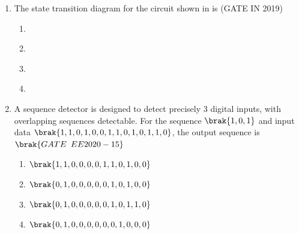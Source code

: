 \begin{enumerate}[label=\arabic*.,ref=\theenumi]
\begin{figure}[H]
\caption{}
\label{fig:3bitcounter.jpg}
\end{figure}
%
\item The state transition diagram for the circuit shown in 
	is
                         \hfill(GATE IN 2019)
\begin{figure}[H]
\centering
    \resizebox{0.5\columnwidth}{!}{%

	}
    \caption{}
	\label{fig:GATE IN2019,39}
\end{figure}
%
\begin{enumerate}
\item 
\begin{figure}[H]
\centering
    \resizebox{0.5\columnwidth}{!}{%

	}
    \caption{}
	\label{fig:GATE IN2019,39-1}
\end{figure}
\item 
\begin{figure}[H]
\centering
    \resizebox{0.5\columnwidth}{!}{%

	}
    \caption{}
	\label{fig:GATE IN2019,39-2}
\end{figure}
\item 
\begin{figure}[H]
\centering
    \resizebox{0.5\columnwidth}{!}{%

	}
    \caption{}
	\label{fig:GATE IN2019,39-3}
\end{figure}
\item 
\begin{figure}[H]
\centering
    \resizebox{0.5\columnwidth}{!}{%

	}
    \caption{}
	\label{fig:GATE IN2019,39-4}
\end{figure}
%
\end{enumerate}
%
\iffalse
\item A sequence detector is designed to detect precisely $3$ digital inputs, with overlapping sequences detectable. For the sequence $\brak{1,0,1}$ and input data $\brak{1,1,0,1,0,0,1,1,0,1,0,1,1,0}$, the output sequence is
$\hfill\brak{GATE\enspace EE2020-15}$
   \begin{enumerate}
  \item  $\brak{1,1,0,0,0,0,1,1,0,1,0,0}$
  \item $\brak{0,1,0,0,0,0,0,1,0,1,0,0}$
  \item $\brak{0,1,0,0,0,0,0,1,0,1,1,0}$
  \item $\brak{0,1,0,0,0,0,0,0,1,0,0,0}$


\end{enumerate}
\end{enumerate}
